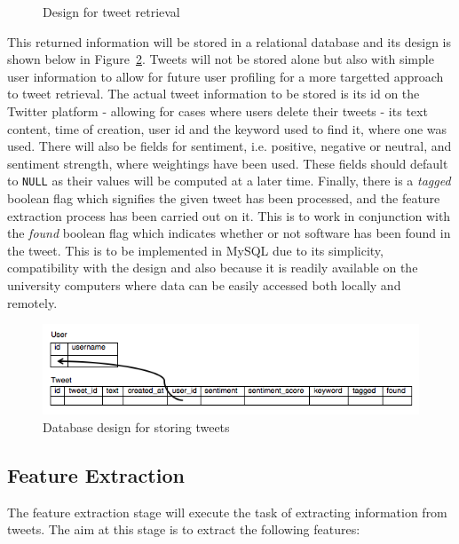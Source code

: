 \begin{figure}[h]
  \centering
  
  \caption{Design for tweet retrieval
    \label{fig:phase1}}
\end{figure}

This returned information will be stored in a relational database and its design is shown below in Figure~\ref{fig:db}. Tweets will not be stored alone but also with simple user information to allow for future user profiling for a more targetted approach to tweet retrieval. The actual tweet information to be stored is its id on the Twitter platform - allowing for cases where users delete their tweets - its text content, time of creation, user id and the keyword used to find it, where one was used. There will also be fields for sentiment, i.e. positive, negative or neutral, and sentiment strength, where weightings have been used. These fields should default to \texttt{NULL} as their values will be computed at a later time. Finally, there is a \emph{tagged} boolean flag which signifies the given tweet has been processed, and the feature extraction process has been carried out on it. This is to work in conjunction with the \emph{found} boolean flag which indicates whether or not software has been found in the tweet. This is to be implemented in MySQL due to its simplicity, compatibility with the design and also because it is readily available on the university computers where data can be easily accessed both locally and remotely.

\begin{figure}[h]
\begin{center}
\includegraphics[width=12cm]{db}
\end{center}
\caption{Database design for storing tweets}
\label{fig:db}
\end{figure}

\subsection{Feature Extraction}
\label{sec:arc2}
The feature extraction stage will execute the task of extracting information from tweets. The aim at this stage is to extract the following features:

